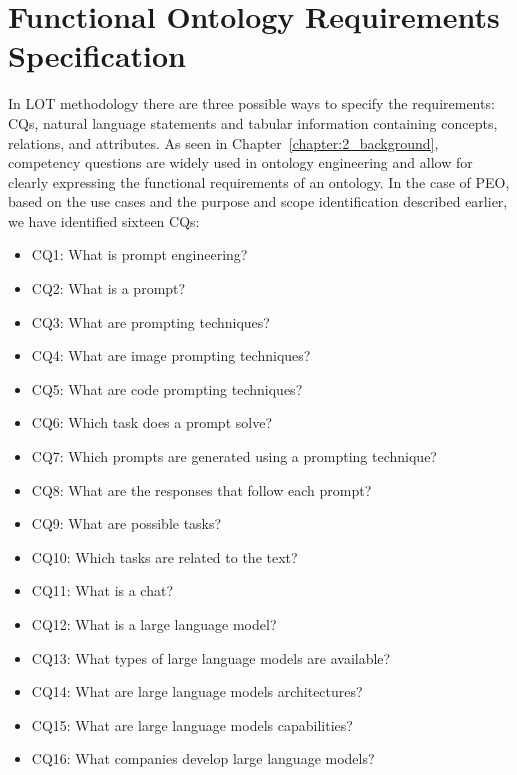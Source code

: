 \section{Functional Ontology Requirements Specification}
In LOT methodology there are three possible ways to specify the requirements: CQs, natural language statements and tabular information containing concepts, relations, and attributes.
As seen in Chapter~\ref{chapter:2_background}, competency questions are widely used in ontology engineering and allow for clearly expressing the functional requirements of an ontology.
In the case of PEO, based on the use cases and the purpose and scope identification described earlier, we have identified sixteen CQs:
\begin{itemize}
    \item CQ1: What is prompt engineering?

    \item CQ2: What is a prompt?

    \item CQ3: What are prompting techniques?

    \item CQ4: What are image prompting techniques?

    \item CQ5: What are code prompting techniques?

    \item CQ6: Which task does a prompt solve?

    \item CQ7: Which prompts are generated using a prompting technique?

    \item CQ8: What are the responses that follow each prompt?

    \item CQ9: What are possible tasks?

    \item CQ10: Which tasks are related to the text?

    \item CQ11: What is a chat?

    \item CQ12: What is a large language model?

    \item CQ13: What types of large language models are available?

    \item CQ14: What are large language models architectures?

    \item CQ15: What are large language models capabilities?

    \item CQ16: What companies develop large language models?
\end{itemize}


